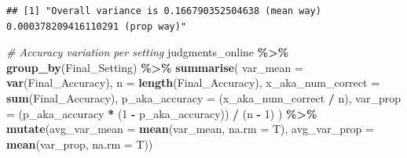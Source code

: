 \documentclass[
]{article}
\newenvironment{Shaded}{\begin{snugshade}}{\end{snugshade}}
\newcommand{\AttributeTok}[1]{\textcolor[rgb]{0.13,0.29,0.53}{#1}}
\newcommand{\CommentTok}[1]{\textcolor[rgb]{0.56,0.35,0.01}{\textit{#1}}}
\newcommand{\DecValTok}[1]{\textcolor[rgb]{0.00,0.00,0.81}{#1}}
\newcommand{\FunctionTok}[1]{\textcolor[rgb]{0.13,0.29,0.53}{\textbf{#1}}}
\newcommand{\NormalTok}[1]{#1}
\newcommand{\SpecialCharTok}[1]{\textcolor[rgb]{0.81,0.36,0.00}{\textbf{#1}}}
\newcommand{\StringTok}[1]{\textcolor[rgb]{0.31,0.60,0.02}{#1}}
\begin{document}
\begin{Shaded}
\end{Shaded}

\begin{verbatim}
## [1] "Overall variance is 0.166790352504638 (mean way) 0.000378209416110291 (prop way)"
\end{verbatim}

\begin{Shaded}
\begin{Highlighting}[]
\CommentTok{\# Accuracy variation per setting}
\NormalTok{judgments\_online }\SpecialCharTok{\%\textgreater{}\%}
  \FunctionTok{group\_by}\NormalTok{(Final\_Setting) }\SpecialCharTok{\%\textgreater{}\%}
  \FunctionTok{summarise}\NormalTok{(}
    \AttributeTok{var\_mean =} \FunctionTok{var}\NormalTok{(Final\_Accuracy),}
    \AttributeTok{n =} \FunctionTok{length}\NormalTok{(Final\_Accuracy),}
    \AttributeTok{x\_aka\_num\_correct =} \FunctionTok{sum}\NormalTok{(Final\_Accuracy),}
    \AttributeTok{p\_aka\_accuracy =}\NormalTok{ (x\_aka\_num\_correct }\SpecialCharTok{/}\NormalTok{ n),}
    \AttributeTok{var\_prop =}\NormalTok{ (p\_aka\_accuracy }\SpecialCharTok{*}\NormalTok{ (}\DecValTok{1} \SpecialCharTok{{-}}\NormalTok{ p\_aka\_accuracy)) }\SpecialCharTok{/}\NormalTok{ (n }\SpecialCharTok{{-}} \DecValTok{1}\NormalTok{)}
\NormalTok{  ) }\SpecialCharTok{\%\textgreater{}\%} \FunctionTok{mutate}\NormalTok{(}\AttributeTok{avg\_var\_mean =} \FunctionTok{mean}\NormalTok{(var\_mean, }\AttributeTok{na.rm =}\NormalTok{ T),}
               \AttributeTok{avg\_var\_prop =} \FunctionTok{mean}\NormalTok{(var\_prop, }\AttributeTok{na.rm =}\NormalTok{ T))}
\end{Highlighting}
\end{Shaded}
\end{document}
